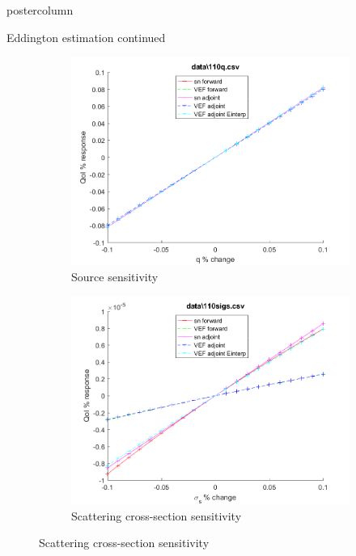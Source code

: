 \documentclass[xcolor={usenames,dvipsnames,svgnames,table}]{beamer}
\begin{document}
\begin{frame}
\begin{columns}
\begin{column}{.33\textwidth}
\begin{beamercolorbox}[center,wd=\textwidth]{postercolumn}
\begin{minipage}[T]{0.95\textwidth}
{\begin{block}{Eddington estimation continued}
\begin{figure}[H]
\label{Case110Sens}
\centering
\begin{subfigure}{.4\textwidth}
  \centering
  \includegraphics[width=.98\linewidth]{110qSens.png}  \caption{Source sensitivity}
  \label{fig:sfig1}
\end{subfigure}%
\begin{subfigure}{.4\textwidth}
  \centering
  \includegraphics[width=.98\linewidth]{110sigsSens.png}
  \caption{Scattering cross-section sensitivity}
  \label{fig:sfig2}
\end{subfigure}


\end{figure}
\end{block}}
\end{minipage}
\end{beamercolorbox}
\end{column}
\end{columns}
\end{frame}
\end{document}
